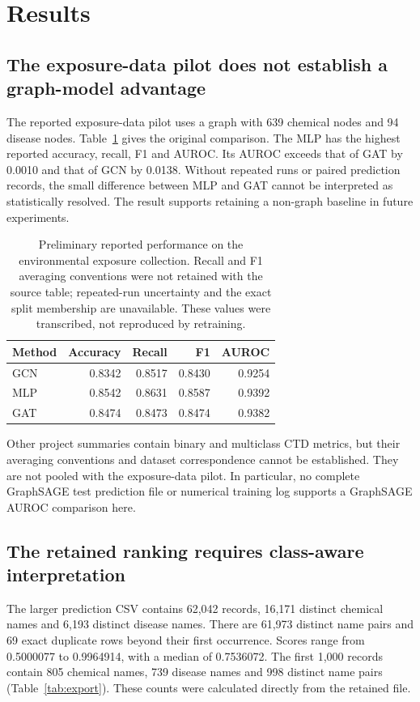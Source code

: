 \section{Results}
\subsection{The exposure-data pilot does not establish a graph-model advantage}
The reported exposure-data pilot uses a graph with 639 chemical nodes and 94 disease nodes. Table~\ref{tab:pilot} gives the original comparison. The MLP has the highest reported accuracy, recall, F1 and AUROC. Its AUROC exceeds that of GAT by 0.0010 and that of GCN by 0.0138. Without repeated runs or paired prediction records, the small difference between MLP and GAT cannot be interpreted as statistically resolved. The result supports retaining a non-graph baseline in future experiments.

\begin{table}[htbp]
\centering
\caption{Preliminary reported performance on the environmental exposure collection. Recall and F1 averaging conventions were not retained with the source table; repeated-run uncertainty and the exact split membership are unavailable. These values were transcribed, not reproduced by retraining.}
\label{tab:pilot}
\begin{tabular}{lrrrr}
\toprule
Method & Accuracy & Recall & F1 & AUROC \\
\midrule
GCN & 0.8342 & 0.8517 & 0.8430 & 0.9254 \\
MLP & 0.8542 & 0.8631 & 0.8587 & 0.9392 \\
GAT & 0.8474 & 0.8473 & 0.8474 & 0.9382 \\
\bottomrule
\end{tabular}
\end{table}

Other project summaries contain binary and multiclass CTD metrics, but their averaging conventions and dataset correspondence cannot be established. They are not pooled with the exposure-data pilot. In particular, no complete GraphSAGE test prediction file or numerical training log supports a GraphSAGE AUROC comparison here.

\subsection{The retained ranking requires class-aware interpretation}
The larger prediction CSV contains 62,042 records, 16,171 distinct chemical names and 6,193 distinct disease names. There are 61,973 distinct name pairs and 69 exact duplicate rows beyond their first occurrence. Scores range from 0.5000077 to 0.9964914, with a median of 0.7536072. The first 1,000 records contain 805 chemical names, 739 disease names and 998 distinct name pairs (Table~\ref{tab:export}). These counts were calculated directly from the retained file.

